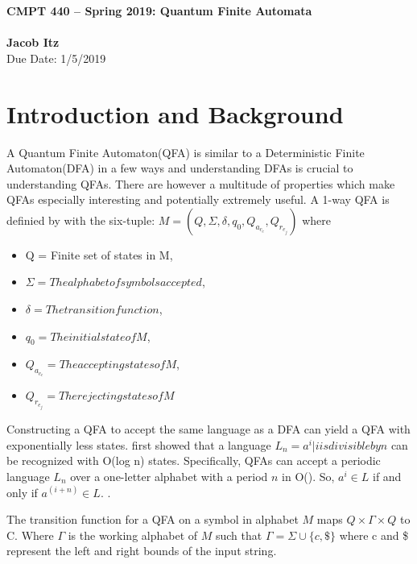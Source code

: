 \documentclass[letter, 12pt]{article}
\begin{document}
\noindent
\large\textbf{CMPT 440 -- Spring 2019: Quantum Finite Automata} \\ \\
\textbf{Jacob Itz} \\
\normalsize   Due Date: 1/5/2019


\section*{Introduction and Background}
A Quantum Finite Automaton(QFA) is similar to a Deterministic Finite Automaton(DFA) in a few ways and understanding DFAs is crucial to understanding QFAs.  There are however a multitude of properties which make QFAs especially interesting and potentially extremely useful.  A 1-way QFA is definied  by \cite{ambainis19981} with the six-tuple: $M = (Q, \Sigma, \delta, q_0, Q_a_c_c, Q_r_e_j)$ where 
\begin{itemize}
    \item Q = Finite set of states in M,
    \item $\Sigma = The alphabet of symbols accepted$,
    \item $\delta = The transition function$,
    \item $q_0 = The initial state of M$,
    \item $Q_a_c_c = The accepting states of M$,
    \item $Q_r_e_j = The rejecting states of M$
\end{itemize}
Constructing a QFA to accept the same language as a DFA can yield a QFA with exponentially less states.  \cite{ambainis19981} first showed that a language $L_n = {a^i| i is divisible by n}$ can be recognized with O(log n) states.  Specifically, QFAs can accept a periodic language $L_n$ over a one-letter alphabet with a period $n$ in O(). So, $a^i \in L$ if and only if $a^(i+n) \in L$. \cite{ambainis2011quantum}.

The transition function for a QFA on a symbol in alphabet $M$ maps $Q \times \Gamma \times Q$ to C.  Where $\Gamma$ is the working alphabet of $M$ such that $\Gamma = \Sigma \cup \{c, \$\}$ where c and \$ represent the left and right bounds of the input string. \cite{ambainis19981}  









\end{document}
